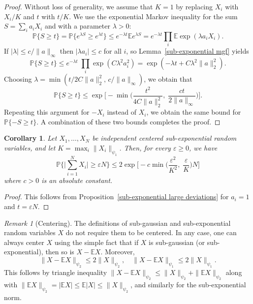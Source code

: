 \documentclass[10pt, openany]{book}
\newtheorem{corollary}[theorem]{Corollary}
\theoremstyle{remark}
\newtheorem{remark}[theorem]{Remark}
\def \E {\mathbb{E}}
\def \P {\mathbb{P}}
\def \e {\varepsilon}
\def \l {\lambda}
\def \psione {{\psi_1}}
\def \psitwo {{\psi_2}}
\begin{document}
\begin{proof}
Without loss of generality, we assume that $K=1$ by replacing $X_i$ with $X_i/K$ 
and $t$ with $t/K$. We use the exponential Markov inequality for
the sum $S = \sum_i a_i X_i$ and with a parameter $\l>0$:
$$
\P \{ S \ge t \} 
= \P \{ e^{\l S} \ge e^{\l t} \}  
\le e^{-\l t} \E e^{\l S}
= e^{-\l t} \prod_i \E \exp (\l a_i X_i).
$$
If $|\l| \le c/\|a\|_\infty$ then $|\l a_i| \le c$ for all $i$, so Lemma~\ref{sub-exponential mgf} yields
$$
\P \{ S \ge t \}  
\le e^{-\l t} \; \prod_i \exp (C \l^2 a_i^2) 
=  \exp(-\l t + C \l^2 \|a\|_2^2).
$$
Choosing $\l = \min( t/2C\|a\|_2^2, \, c/\|a\|_\infty )$, we obtain that 
$$
\P \{ S \ge t \} \le \exp \Big[ - \min \Big( \frac{t^2}{4C\|a\|_2^2}, \; \frac{ct}{2\|a\|_\infty} \Big) \Big].
$$
Repeating this argument for $-X_i$ instead of $X_i$, we obtain the same bound for
$\P \{ -S \ge t \}$. A combination of these two bounds completes the proof.
\end{proof}


\begin{corollary}						\label{average sub-exponentials}
  Let $X_1,\ldots,X_N$ be independent centered sub-exponential random variables,
  and let $K = \max_i \|X_i\|_\psione$. 
  Then, for every $\e \ge 0$, we have
  $$
  \P \Big\{ \Big| \sum_{i=1}^N X_i \Big| \ge \e N \Big\} 
  \le 2 \exp \Big[ -c \min \Big( \frac{\e^2}{K^2}, \; \frac{\e}{K} \Big) N \Big]
  $$  
  where $c>0$ is an absolute constant.  
\end{corollary}

\begin{proof}
This follows from Proposition~\ref{sub-exponential large deviations} for $a_i=1$ and $t=\e N$.
\end{proof}


\begin{remark}[Centering]				\label{centering}
The definitions of sub-gaussian and sub-exponential random variables $X$ do not require
them to be centered. In any case, one can always center $X$ using the simple fact that
if $X$ is sub-gaussian (or sub-exponential), then so is $X - \E X$. Moreover,  
$$
\|X - \E X\|_\psitwo \le 2 \|X\|_\psitwo, \quad
\|X - \E X\|_\psione \le 2 \|X\|_\psione.
$$
This follows by triangle inequality
$\|X - \E X\|_\psitwo \le \|X\|_\psitwo + \|\E X\|_\psitwo$ along with 
$\|\E X\|_\psitwo = |\E X| \le \E|X| \le \|X\|_\psitwo$,
and similarly for the sub-exponential norm.
\end{remark}
\end{document}
